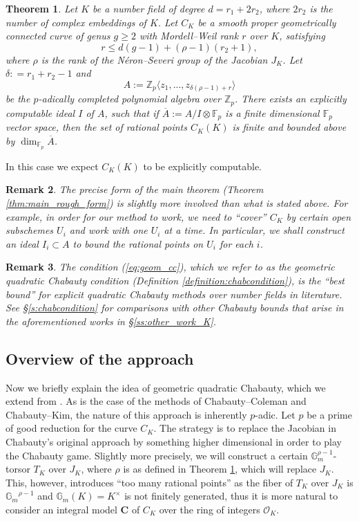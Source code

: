 \documentclass[11pt,oneside]{amsart}
\theoremstyle{plain}
\newtheorem{mainthm}{Theorem}
\newtheorem{mainrmk}[mainthm]{Remark}
\theoremstyle{definition}
\def\G{{\bf G}}
\DeclareMathOperator{\Gm}{\mathbb{G}_m}
\def\Z{\mathbb{Z}}
\def\F{\mathbb{F}}
\def\G{\mathbb{G}}
\def\CC{\mathbf{C}}
\def\Gm{{\mathbb{G}_m}}
\def\oh{\mathcal{O}}
\begin{document}
\begin{mainthm} \label{thm:intro_main}
Let $K$ be a number field of degree $d = r_1 +2 r_2$, where $2r_2$ is the number of complex embeddings of $K$.  Let $C_K$ be a smooth proper geometrically connected curve of genus $g \ge 2$ with Mordell--Weil rank $r$ over $K$, satisfying
 \begin{equation} \label{eq:geom_cc}
  r \le d(g-1) + (\rho - 1) (r_2 + 1),
  \end{equation}
 where $\rho$ is the rank of the N\'eron--Severi group of the Jacobian $J_K$. Let $\delta : = r_1 + r_2 - 1$ and 
 $$ A := \Z_p \langle z_1, ..., z_{\delta (\rho - 1)+ r} \rangle $$
 be the $p$-adically completed polynomial algebra over $\Z_p$. There exists an explicitly computable ideal $I$ of $A$, such that if $\overline A:= A/I \otimes \F_p$ is a finite dimensional $\F_p$ vector space, then the set of rational points $C_K(K)$ is finite and bounded above by $\dim_{\F_p} \overline A$. 
 \end{mainthm}
In this case we expect $C_K (K)$ to be explicitly computable. 

\begin{mainrmk} \label{remark:main_intro}
The precise form of the main theorem (Theorem \ref{thm:main_rough_form}) is slightly more involved than what is stated above. For example, in order for our method to work, we need to ``cover'' $C_K$ by certain open subschemes $U_i$ and work with one $U_i$ at a time. In particular, we shall construct an ideal $I_i \subset A$ to bound the rational points on $U_i$ for each $i$.  
\end{mainrmk}

\begin{mainrmk}
The condition (\ref{eq:geom_cc}), which we refer to as the geometric quadratic Chabauty condition (Definition \ref{definition:chabcondition}), is the ``best bound'' for explicit quadratic Chabauty methods over number fields in literature. See \S \ref{s:chabcondition} for comparisons with other Chabauty bounds that arise in the aforementioned works in \S \ref{ss:other_work_K}. 
\end{mainrmk}
 
 
\subsection{Overview of the approach}
Now we briefly explain the idea of geometric quadratic Chabauty, which we extend from \cite{EL19}.  
As is the case of the methods of Chabauty--Coleman and Chabauty--Kim, the nature of this approach is inherently $p$-adic. Let $p$ be a prime of good reduction for the curve $C_K$. The strategy is to replace the Jacobian in Chabauty's original approach by something higher dimensional in order to play the Chabauty game. Slightly more precisely, we will construct a certain $\G_m^{\rho-1}$-torsor $T_K$ over $J_K$, where $\rho$ is as defined in Theorem \ref{thm:intro_main}, which will replace $J_K$. This, however, introduces ``too many rational points'' as the fiber of $T_K$ over $J_K$ is $\Gm^{\rho - 1}$ and $\Gm(K) = K^\times$ is not finitely generated, thus it is more natural to consider an integral model $\CC$ of $C_K$ over the ring of integers $\oh_K$. 
\end{document}
